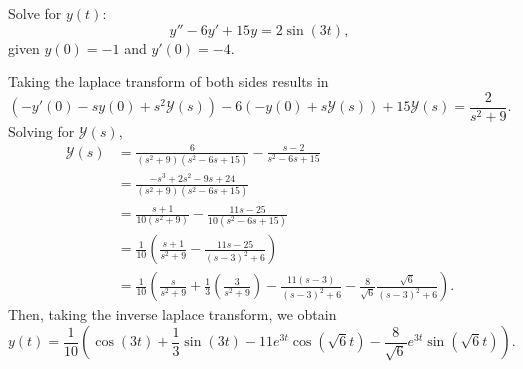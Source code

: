 \begin{example}
    Solve for $y(t)$:
    $$y''-6y'+15y = 2\sin(3t),$$
    given $y(0)=-1$ and $y'(0)=-4$.
\end{example}
\begin{soln}
    Taking the laplace transform of both sides results in
    $$\left( -y'(0)-sy(0)+s^2\mathcal{Y}(s)\right)-6\left( -y(0)+s\mathcal{Y}(s)\right)+15\mathcal{Y}(s) = \frac{2}{s^2+9}.$$
    Solving for $\mathcal{Y}(s)$,
    \begin{align*}
        \mathcal{Y}(s) &= \frac{6}{(s^2+9)(s^2-6s+15)}-\frac{s-2}{s^2-6s+15} \\
                       &= \frac{-s^3+2s^2-9s+24}{(s^2+9)(s^2-6s+15)} \\
                       &= \frac{s+1}{10(s^2+9)}-\frac{11s-25}{10(s^2-6s+15)} \\
                       &= \frac{1}{10}\left(\frac{s+1}{s^2+9}-\frac{11s-25}{(s-3)^2+6}\right) \\
                       &= \frac{1}{10}\left( \frac{s}{s^2+9} + \frac{1}{3}\left(\frac{3}{s^2+9}\right)-\frac{11(s-3)}{(s-3)^2+6}-\frac{8}{\sqrt{6}}\frac{\sqrt{6}}{(s-3)^2+6}\right).
    \end{align*}
    Then, taking the inverse laplace transform, we obtain
    $$y(t) = \frac{1}{10}\left( \cos(3t)+\frac{1}{3}\sin(3t)-11e^{3t}\cos(\sqrt{6}t)-\frac{8}{\sqrt{6}}e^{3t}\sin(\sqrt{6}t)\right).$$
\end{soln}
